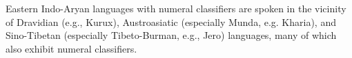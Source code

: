 \documentclass[11pt]{article}
\begin{document}
Eastern Indo-Aryan languages with numeral classifiers are spoken in the vicinity of Dravidian (e.g., Kurux), Austroasiatic (especially Munda, e.g. Kharia), and Sino-Tibetan (especially Tibeto-Burman, e.g., Jero) languages, many of which also exhibit numeral classifiers. 
\end{document}
